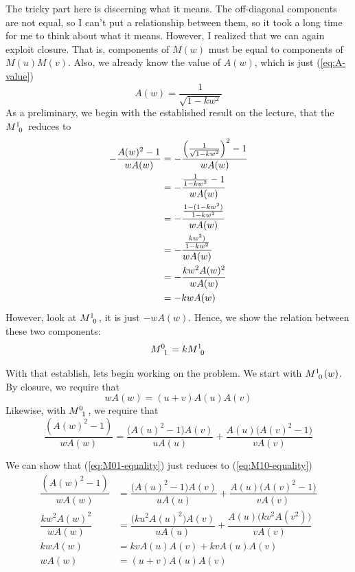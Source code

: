 \begin{solution_pset}
		The tricky part here is discerning what it means. The off-diagonal components are not equal, so 
		I can't put a relationship between them, so it took a long time for me to 
		think about what it means. However, I realized that we can again exploit closure.
		That is, components of $M(w)$ must be equal to components of $M(u) M(v)$.
		Also, we already know the value of $A(w)$, which is just (\ref{eq:A-value})
		\[
			A(w) = \frac{1}{\sqrt{1-kw^2}}
		\]
		As a preliminary, we begin with the established result on the lecture, that
		the $M\indices{^1_0}$ reduces to
		\begin{align*}
			-
		   \frac{A(w)^2 - 1}{w A(w)} 
		   &=
		   -
		   \frac{
			   \pqty{\frac{1}{\sqrt{1-kw^2}}}^2 - 1
		   }{w A(w)} \\
		   &=
		   -
		   \frac{
			   {\frac{1}{{1-kw^2}}} - 1
		   }{w A(w)} \\
		   &=
		   -
		   \frac{
			   {\frac{1 - (1-kw^2)}{{1-kw^2}}} 
		   }{w A(w)} \\
		   &=
		   -
		   \frac{
			   {\frac{kw^2)}{{1-kw^2}}} 
		   }{w A(w)} \\
		   &=
		   -
		   \frac{
			   kw^2 A(w)^2
		   }{w A(w)} \\
		   &=
		   -kw A(w)
		\end{align*}
		However, look at $M\indices{^1_0}$, it is just $-w A(w)$.
		Hence, we show the relation between these two components:
		\begin{equation}
			\label{eq:M01-M10 relation}
			M\indices{^0_1} 
			=
			k
			M\indices{^1_0} 
		\end{equation}
		
		With that establish, lets begin working on the problem.
		We start with $M\indices{^1_0}(w)$. By closure, we require that
		\begin{equation}
			\label{eq:M10-equality}
		    w A(w) = (u + v) A(u) A(v)
		\end{equation}
		Likewise, with $M\indices{^0_1}$, we require that
		\begin{equation}
			\label{eq:M01-equality}
			\dfrac{(A(w)^2-1)}{wA(w)} 
			=
			\dfrac{\bigl(A(u)^2-1\bigr)A(v)}{uA(u)} + \dfrac{A(u)\bigl(A(v)^2-1\bigr)}{vA(v)}  
		\end{equation}
		
		We can show that (\ref{eq:M01-equality}) just 
		reduces to (\ref{eq:M10-equality})
		\begin{align*}
			\dfrac{(A(w)^2-1)}{wA(w)} 
			&=
			\dfrac{\bigl(A(u)^2-1\bigr)A(v)}{uA(u)} 
			+
			\dfrac{A(u)\bigl(A(v)^2-1\bigr)}{vA(v)} \\
			\dfrac{kw^2A(w)^2}{wA(w)} 
			&=
			\dfrac{\bigl(ku^2 A(u)^2 \bigr)A(v)}{uA(u)} 
			+
			\dfrac{A(u)\bigl(kv^2 A(v^2)\bigr)}{vA(v)} \\
			kwA(w)
			&=
			kvA(u)A(v)
			+
			kvA(u)A(v)\\
			wA(w)
			&=
			(u+v)
			A(u) A(v)
		\end{align*}


\end{solution_pset}

